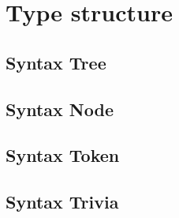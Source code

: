 \section{Type structure}
\label{sec:type-structure}

\subsection{Syntax Tree}
\label{sec:syntax-tree}

\subsection{Syntax Node}
\label{sec:syntax-node}

\subsection{Syntax Token}
\label{sec:syntax-token}

\subsection{Syntax Trivia}
\label{sec:syntax-trivia}
